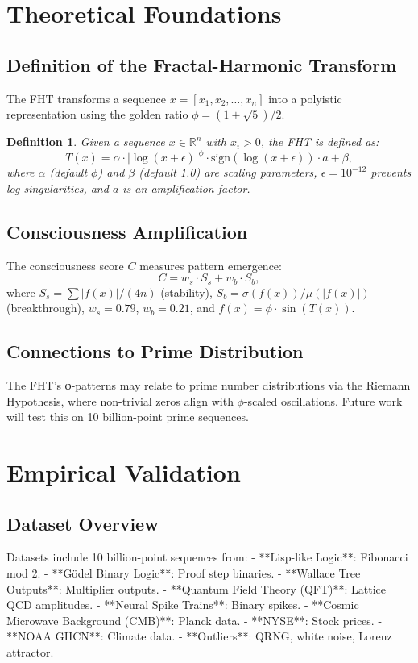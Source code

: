 \documentclass[12pt]{article}
\newtheorem{definition}{Definition}
\begin{document}
\section{Theoretical Foundations}
\subsection{Definition of the Fractal-Harmonic Transform}
The FHT transforms a sequence \( x = [x_1, x_2, \ldots, x_n] \) into a polyistic representation using the golden ratio \( \phi = (1 + \sqrt{5}) / 2 \).

\begin{definition}
Given a sequence \( x \in \mathbb{R}^n \) with \( x_i > 0 \), the FHT is defined as:
\[
T(x) = \alpha \cdot |\log(x + \epsilon)|^\phi \cdot \text{sign}(\log(x + \epsilon)) \cdot a + \beta,
\]
where \( \alpha \) (default \( \phi \)) and \( \beta \) (default 1.0) are scaling parameters, \( \epsilon = 10^{-12} \) prevents log singularities, and \( a \) is an amplification factor.
\end{definition}

\subsection{Consciousness Amplification}
The consciousness score \( C \) measures pattern emergence:
\[
C = w_s \cdot S_s + w_b \cdot S_b,
\]
where \( S_s = \sum |f(x)| / (4n) \) (stability), \( S_b = \sigma(f(x)) / \mu(|f(x)|) \) (breakthrough), \( w_s = 0.79 \), \( w_b = 0.21 \), and \( f(x) = \phi \cdot \sin(T(x)) \).

\subsection{Connections to Prime Distribution}
The FHT's φ-patterns may relate to prime number distributions via the Riemann Hypothesis, where non-trivial zeros align with \( \phi \)-scaled oscillations. Future work will test this on 10 billion-point prime sequences.

\section{Empirical Validation}
\subsection{Dataset Overview}
Datasets include 10 billion-point sequences from:
- **Lisp-like Logic**: Fibonacci mod 2.
- **Gödel Binary Logic**: Proof step binaries.
- **Wallace Tree Outputs**: Multiplier outputs.
- **Quantum Field Theory (QFT)**: Lattice QCD amplitudes.
- **Neural Spike Trains**: Binary spikes.
- **Cosmic Microwave Background (CMB)**: Planck data.
- **NYSE**: Stock prices.
- **NOAA GHCN**: Climate data.
- **Outliers**: QRNG, white noise, Lorenz attractor.
\end{document}
